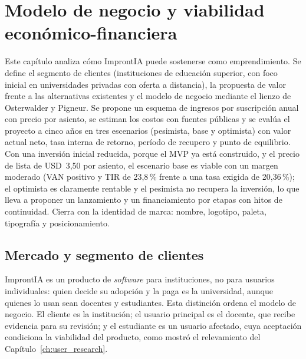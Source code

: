 \chapter{Modelo de negocio y viabilidad económico-financiera}
\label{ch:negocio}


\begin{chapterabstract}
Este capítulo analiza cómo ImprontIA puede sostenerse como emprendimiento. Se define el segmento de clientes (instituciones de educación superior, con foco inicial en universidades privadas con oferta a distancia), la propuesta de valor frente a las alternativas existentes y el modelo de negocio mediante el lienzo de Osterwalder y Pigneur. Se propone un esquema de ingresos por suscripción anual con precio por asiento, se estiman los costos con fuentes públicas y se evalúa el proyecto a cinco años en tres escenarios (pesimista, base y optimista) con valor actual neto, tasa interna de retorno, período de recupero y punto de equilibrio. Con una inversión inicial reducida, porque el MVP ya está construido, y el precio de lista de USD~3,50 por asiento, el escenario base es viable con un margen moderado (VAN positivo y TIR de 23,8\,\% frente a una tasa exigida de 20,36\,\%); el optimista es claramente rentable y el pesimista no recupera la inversión, lo que lleva a proponer un lanzamiento y un financiamiento por etapas con hitos de continuidad. Cierra con la identidad de marca: nombre, logotipo, paleta, tipografía y posicionamiento.
\end{chapterabstract}

\section{Mercado y segmento de clientes}
\label{sec:neg_mercado}

ImprontIA es un producto de \textit{software} para instituciones, no para usuarios individuales: quien decide su adopción y la paga es la universidad, aunque quienes lo usan sean docentes y estudiantes. Esta distinción ordena el modelo de negocio. El cliente es la institución; el usuario principal es el docente, que recibe evidencia para su revisión; y el estudiante es un usuario afectado, cuya aceptación condiciona la viabilidad del producto, como mostró el relevamiento del Capítulo~\ref{ch:user_research}.

